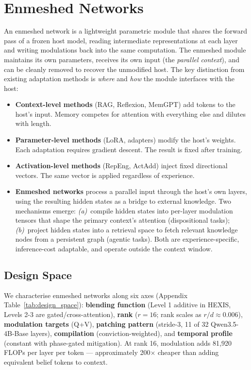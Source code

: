 \section{Enmeshed Networks}
\label{sec:enmeshed}

An enmeshed network is a lightweight parametric module that shares the forward pass of a frozen host model, reading intermediate representations at each layer and writing modulations back into the same computation. The enmeshed module maintains its own parameters, receives its own input (the \emph{parallel context}), and can be cleanly removed to recover the unmodified host. The key distinction from existing adaptation methods is \emph{where} and \emph{how} the module interfaces with the host:

\begin{itemize}[leftmargin=*]
    \item \textbf{Context-level methods} (RAG, Reflexion, MemGPT) add tokens to the host's input. Memory competes for attention with everything else and dilutes with length.
    \item \textbf{Parameter-level methods} (LoRA, adapters) modify the host's weights. Each adaptation requires gradient descent. The result is fixed after training.
    \item \textbf{Activation-level methods} (RepEng, ActAdd) inject fixed directional vectors. The same vector is applied regardless of experience.
    \item \textbf{Enmeshed networks} process a parallel input through the host's own layers, using the resulting hidden states as a bridge to external knowledge. Two mechanisms emerge: \emph{(a)}~compile hidden states into per-layer modulation tensors that shape the primary context's attention (dispositional tasks); \emph{(b)}~project hidden states into a retrieval space to fetch relevant knowledge nodes from a persistent graph (agentic tasks). Both are experience-specific, inference-cost adaptable, and operate outside the context window.
\end{itemize}


\subsection{Design Space}

We characterise enmeshed networks along six axes (Appendix Table~\ref{tab:design_space}): \textbf{blending function} (Level 1 additive in HEXIS, Levels 2-3 are gated/cross-attention), \textbf{rank} ($r=16$; rank scales as $r/d \approx 0.006$), \textbf{modulation targets} (Q+V), \textbf{patching pattern} (stride-3, 11 of 32 Qwen3.5-4B-Base layers), \textbf{compilation} (conviction-weighted), and \textbf{temporal profile} (constant with phase-gated mitigation). At rank 16, modulation adds 81{,}920 FLOPs per layer per token --- approximately 200$\times$ cheaper than adding equivalent belief tokens to context.

